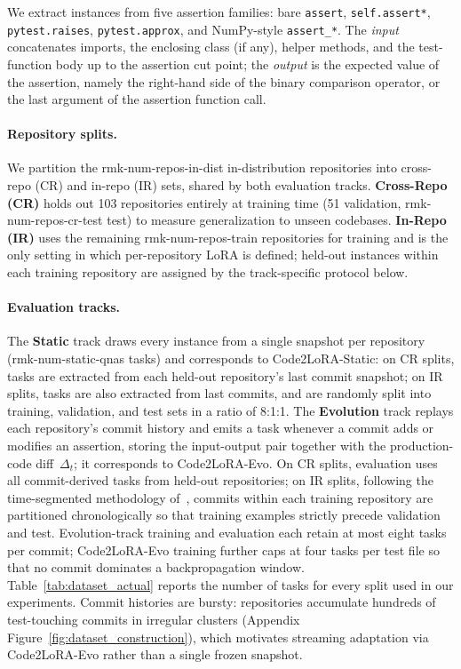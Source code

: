 \documentclass{llmxive}
\providecommand{\UseMacro}[1]{\csname rmk-#1\endcsname}
\providecommand{\codelora}{Code2LoRA\xspace}
\providecommand{\codelorastatic}{\codelora-Static\xspace}
\providecommand{\codeloraevo}{\codelora-Evo\xspace}
\begin{document}
We extract instances from five assertion families: bare \texttt{assert}, \texttt{self.assert*}, \texttt{pytest.raises}, \texttt{pytest.approx}, and NumPy-style \texttt{assert\_*}.
The \emph{input} concatenates imports, the enclosing class (if any), helper methods, and the test-function body up to the assertion cut point;
the \emph{output} is the expected value of the assertion, namely the right-hand side of the binary comparison operator, or the last argument of the assertion function call.

\paragraph{Repository splits.}
\label{sec:benchmark:splits}
We partition the \UseMacro{num-repos-in-dist} in-distribution repositories into cross-repo (CR) and in-repo (IR) sets, shared by both evaluation tracks.
\textbf{Cross-Repo (CR)} holds out 103 repositories entirely at training time (51 validation, \UseMacro{num-repos-cr-test} test) to measure generalization to unseen codebases.
\textbf{In-Repo (IR)} uses the remaining \UseMacro{num-repos-train} repositories for training and is the only setting in which per-repository LoRA is defined; held-out instances within each training repository are assigned by the track-specific protocol below.

\paragraph{Evaluation tracks.}
\label{sec:benchmark:tracks}
\label{sec:benchmark:evolution}
The \textbf{Static} track draws every instance from a single snapshot per repository (\UseMacro{num-static-qnas} tasks) and corresponds to \codelorastatic{}:
on CR splits, tasks are extracted from each held-out repository's last commit snapshot;
on IR splits, tasks are also extracted from last commits, and are randomly split into training, validation, and test sets in a ratio of 8:1:1.
The \textbf{Evolution} track replays each repository's commit history and emits a task whenever a commit adds or modifies an assertion, storing the input-output pair together with the production-code diff~$\Delta_t$; it corresponds to \codeloraevo{}.
On CR splits, evaluation uses all commit-derived tasks from held-out repositories;
on IR splits, following the time-segmented methodology of~\citet{nie2022impact}, commits within each training repository are partitioned chronologically so that training examples strictly precede validation and test.
Evolution-track training and evaluation each retain at most eight tasks per commit; \codeloraevo{} training further caps at four tasks per test file so that no commit dominates a backpropagation window.
Table~\ref{tab:dataset_actual} reports the number of tasks for every split used in our experiments.
Commit histories are bursty: repositories accumulate hundreds of test-touching commits in irregular clusters (Appendix Figure~\ref{fig:dataset_construction}), which motivates streaming adaptation via \codeloraevo{} rather than a single frozen snapshot.
\end{document}
